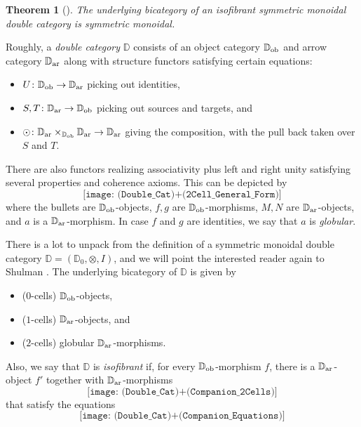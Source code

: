 \documentclass[11pt]{amsart}
\newcommand{\DD}{\mathbb{D}}
\renewcommand{\t}[1]{\textup{#1}}
\newcommand{\from}{\colon}
\newtheorem{thm}{Theorem}[section]
\theoremstyle{remark}
\theoremstyle{definition}
\begin{document}
\begin{thm}[{\cite[{Thm.~1.2}]{Shul}}]
	\label{thm:Shulmans thm}
	The underlying bicategory of an isofibrant symmetric monoidal double category is symmetric monoidal.  
\end{thm}

Roughly, a \emph{double category} $\DD$ consists of an object category $\DD_\t{ob}$ and arrow category $\DD_\t{ar}$ along with structure functors satisfying certain equations:
\begin{itemize}
	\item $U \from \DD_\t{ob} \to \DD_\t{ar}$ picking out identities,
	\item $S,T \from \DD_\t{ar} \to \DD_\t{ob}$ picking out sources and targets, and
	\item $\odot \from \DD_\t{ar} \times_{\DD_\t{ob}} \DD_\t{ar} \to \DD_\t{ar}$ giving the composition, with the pull back taken over $S$ and $T$.
\end{itemize}
There are also functors realizing associativity plus left and right unity satisfying several properties and coherence axioms.  This can be depicted by
\[
\texttt{[image: (Double\_Cat)+(2Cell\_General\_Form)]}
\]
where the bullets are $\DD_\t{ob}$-objects, $f,g$ are $\DD_\t{ob}$-morphisms, $M,N$ are $\DD_\t{ar}$-objects, and $a$ is a $\DD_\t{ar}$-morphism.  In case $f$ and $g$ are identities, we say that $a$ is \emph{globular}.

There is a lot to unpack from the definition of a symmetric monoidal double category $\DD = (\DD_0,\otimes,I)$, and we will point the interested reader again to Shulman \cite[Def.~2.9]{Shul}.  The underlying bicategory of $\DD$ is given by
\begin{itemize}
	\item ($0$-cells) $\DD_\t{ob}$-objects,
	\item ($1$-cells) $\DD_\t{ar}$-objects, and
	\item ($2$-cells) globular $\DD_\t{ar}$-morphisms.
\end{itemize}
Also, we say that $\DD$ is \emph{isofibrant} if, for every $\DD_\t{ob}$-morphism $f$, there is a  $\DD_\t{ar}$-object $f'$ together with $\DD_\t{ar}$-morphisms
\[
\texttt{[image: (Double\_Cat)+(Companion\_2Cells)]}
\]
that satisfy the equations
\[
\texttt{[image: (Double\_Cat)+(Companion\_Equations)]}
\]
\end{document}
